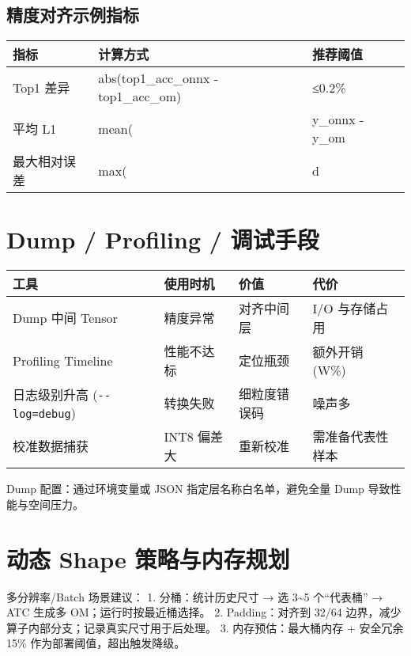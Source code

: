 \subsection{精度对齐示例指标}\label{ux7cbeux5ea6ux5bf9ux9f50ux793aux4f8bux6307ux6807}

\begin{longtable}[]{@{}lll@{}}
\toprule\noalign{}
指标 & 计算方式 & 推荐阈值 \\
\midrule\noalign{}
\endhead
\bottomrule\noalign{}
\endlastfoot
Top1 差异 & abs(top1\_acc\_onnx - top1\_acc\_om) & ≤0.2\% \\
平均 L1 & mean( & y\_onnx - y\_om \\
最大相对误差 & max( & d \\
\end{longtable}

\section{Dump / Profiling /
调试手段}\label{dump-profiling-ux8c03ux8bd5ux624bux6bb5}

\begin{longtable}[]{@{}llll@{}}
\toprule\noalign{}
工具 & 使用时机 & 价值 & 代价 \\
\midrule\noalign{}
\endhead
\bottomrule\noalign{}
\endlastfoot
Dump 中间 Tensor & 精度异常 & 对齐中间层 & I/O 与存储占用 \\
Profiling Timeline & 性能不达标 & 定位瓶颈 & 额外开销 (W\%) \\
日志级别升高 (\passthrough{\lstinline!--log=debug!}) & 转换失败 &
细粒度错误码 & 噪声多 \\
校准数据捕获 & INT8 偏差大 & 重新校准 & 需准备代表性样本 \\
\end{longtable}

Dump 配置：通过环境变量或 JSON 指定层名称白名单，避免全量 Dump
导致性能与空间压力。

\section{动态 Shape
策略与内存规划}\label{ux52a8ux6001-shape-ux7b56ux7565ux4e0eux5185ux5b58ux89c4ux5212}

多分辨率/Batch 场景建议： 1. 分桶：统计历史尺寸 → 选 3\textasciitilde5
个``代表桶'' → ATC 生成多 OM；运行时按最近桶选择。 2. Padding：对齐到
32/64 边界，减少算子内部分支；记录真实尺寸用于后处理。 3.
内存预估：最大桶内存 + 安全冗余 15\% 作为部署阈值，超出触发降级。

